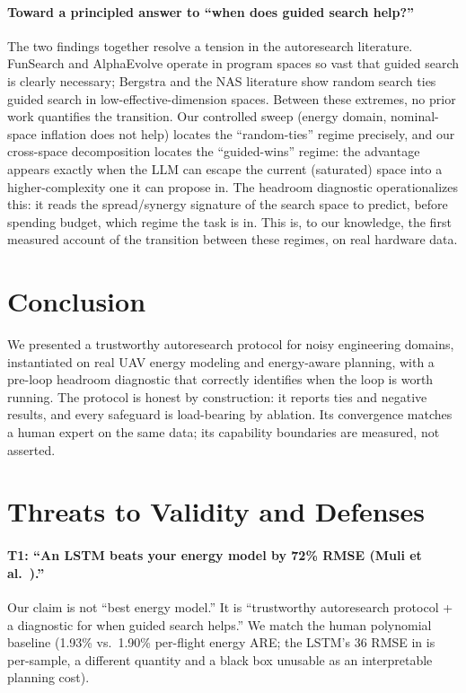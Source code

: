 \documentclass{article}
\begin{document}
\paragraph{Toward a principled answer to ``when does guided search help?''}
The two findings together resolve a tension in the autoresearch literature. FunSearch and
AlphaEvolve operate in program spaces so vast that guided search is clearly necessary;
Bergstra and the NAS literature show random search ties guided search in
low-effective-dimension spaces. Between these extremes, no prior work quantifies the
transition. Our controlled sweep (energy domain, nominal-space inflation does not help)
locates the ``random-ties'' regime precisely, and our cross-space decomposition locates
the ``guided-wins'' regime: the advantage appears exactly when the LLM can escape the
current (saturated) space into a higher-complexity one it can propose in. The headroom
diagnostic operationalizes this: it reads the spread/synergy signature of the search
space to predict, before spending budget, which regime the task is in. This is, to our
knowledge, the first measured account of the transition between these regimes, on real
hardware data.

\section{Conclusion}
\label{sec:conclusion}
We presented a trustworthy autoresearch protocol for noisy engineering domains,
instantiated on real UAV energy modeling and energy-aware planning, with a pre-loop
headroom diagnostic that correctly identifies when the loop is worth running. The
protocol is honest by construction: it reports ties and negative results, and every
safeguard is load-bearing by ablation. Its convergence matches a human expert on the same
data; its capability boundaries are measured, not asserted.

\section{Threats to Validity and Defenses}
\label{sec:threats}
\paragraph{T1: ``An LSTM beats your energy model by 72\% RMSE (Muli et al.\ \citep{muli2022}).''}
Our claim is not ``best energy model.'' It is ``trustworthy autoresearch protocol + a
diagnostic for when guided search helps.'' We match the human polynomial baseline (1.93\%
vs.\ 1.90\% per-flight energy ARE; the LSTM's 36 RMSE in \citep{muli2022} is per-sample, a
different quantity and a black box unusable as an interpretable planning cost).
\end{document}
